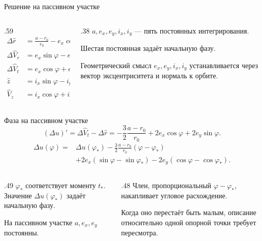 \documentclass[11pt,aspectratio=169,t]{beamer}
\newcommand{\eqcompact}{\fontsize{10}{12}\selectfont}
\newcommand{\dvr}{\Delta\widehat V_r}
\newcommand{\dvt}{\Delta\widehat V_t}
\newcommand{\drh}{\Delta\widehat r}
\newcommand{\vz}{\widehat V_z}
\newcommand{\zh}{\widehat z}
\begin{document}
\begin{frame}{Решение на пассивном участке}
\relax
\begin{columns}[T,onlytextwidth]
\begin{column}{.59\textwidth}
{\eqcompact\derivationmathspacing
\[
\boxed{\begin{aligned}
 \drh&=\frac{a-r_0}{r_0}-e_x\cos\varphi-e_y\sin\varphi,\\[6pt]
 \dvr&=e_x\sin\varphi-e_y\cos\varphi,\\[6pt]
 \dvt&=e_x\cos\varphi+e_y\sin\varphi-\frac{a-r_0}{2r_0},\\[6pt]
 \zh&=i_x\sin\varphi-i_y\cos\varphi,\\[6pt]
 \vz&=i_x\cos\varphi+i_y\sin\varphi.
\end{aligned}}
\]
}
\end{column}
\begin{column}{.38\textwidth}
\RaggedRight
$a,e_x,e_y,i_x,i_y$ — пять постоянных интегрирования.\par\medskip
Шестая постоянная задаёт начальную фазу.\par\medskip
Геометрический смысл $e_x,e_y,i_x,i_y$ устанавливается через вектор эксцентриситета и нормаль к орбите.
\end{column}
\end{columns}
\end{frame}

\begin{frame}{Фаза на пассивном участке}
\relax
{\eqcompact\derivationmathspacing
\[
 (\Delta u)'=\dvt-\drh=-\frac32\frac{a-r_0}{r_0}
                       +2e_x\cos\varphi+2e_y\sin\varphi.
\]
\[
\boxed{\begin{aligned}
 \Delta u(\varphi)={}&\Delta u(\varphi_*)-
      \frac32\frac{a-r_0}{r_0}(\varphi-\varphi_*)\\[4pt]
 &+2e_x(\sin\varphi-\sin\varphi_*)
      -2e_y(\cos\varphi-\cos\varphi_*).
\end{aligned}}
\]
}
\begin{columns}[T,onlytextwidth]
\begin{column}{.49\textwidth}
\RaggedRight
$\varphi_*$ соответствует моменту $t_*$. Значение $\Delta u(\varphi_*)$ задаёт начальную фазу.\par\medskip
На пассивном участке $a,e_x,e_y$ постоянны.
\end{column}
\begin{column}{.48\textwidth}
\RaggedRight
Член, пропорциональный $\varphi-\varphi_*$, накапливает угловое расхождение.\par\medskip
Когда оно перестаёт быть малым, описание относительно одной опорной точки требует пересмотра.
\end{column}
\end{columns}
\end{frame}
\end{document}
